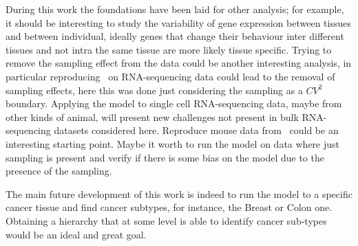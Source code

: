 During this work the foundations have been laid for other analysis; for example, it should be interesting to study the variability of gene expression between tissues and between individual, ideally genes that change their behaviour inter different tissues and not intra the same tissue are more likely tissue specific. Trying to remove the sampling effect from the data could be another interesting analysis, in particular reproducing~\cite{Grilli} on RNA-sequencing data could lead to the removal of sampling effects, here this was done just considering the sampling as a $CV^2$ boundary. Applying the model to single cell RNA-sequencing data, maybe from other kinds of animal, will present new challenges not present in bulk RNA-sequencing datasets considered here. Reproduce mouse data from~\cite{Scialdone2016} could be an interesting starting point. Maybe it worth to run the model on data where just sampling is present and verify if there is some bias on the model due to the presence of the sampling.

The main future development of this work is indeed to run the model to a specific cancer tissue and find cancer subtypes, for instance, the Breast or Colon one. Obtaining a hierarchy that at some level is able to identify cancer sub-types would be an ideal and great goal. 